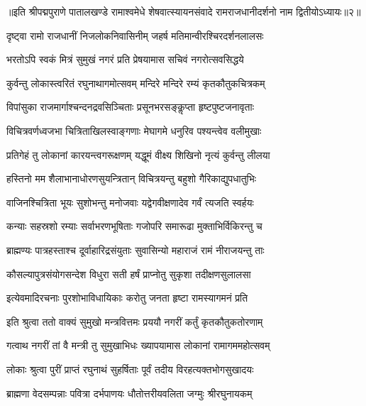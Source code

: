 ॥इति श्रीपद्मपुराणे पातालखण्डे रामाश्वमेधे शेषवात्स्यायनसंवादे रामराजधानीदर्शनो नाम द्वितीयोऽध्यायः॥२॥



\twolineshloka
{दृष्ट्वा रामो राजधानीं निजलोकनिवासिनीम्}
{जहर्ष मतिमान्वीरश्चिरदर्शनलालसः}%

\twolineshloka
{भरतोऽपि स्वकं मित्रं सुमुखं नगरं प्रति}
{प्रेषयामास सचिवं नगरोत्सवसिद्धये}%


\twolineshloka
{कुर्वन्तु लोकास्त्वरितं रघुनाथागमोत्सवम्}
{मन्दिरे मन्दिरे रम्यं कृतकौतुकचित्रकम्}%

\twolineshloka
{विपांसुका राजमार्गाश्चन्दनद्रवसिञ्चिताः}
{प्रसूनभरसङ्कॢप्ता हृष्टपुष्टजनावृताः}%

\twolineshloka
{विचित्रवर्णध्वजभा चित्रिताखिलस्वाङ्गणाः}
{मेघागमे धनुरिव पश्यन्त्वेव वलीमुखाः}%

\twolineshloka
{प्रतिगेहं तु लोकानां कारयन्त्वगरूक्षणम्}
{यद्धूमं वीक्ष्य शिखिनो नृत्यं कुर्वन्तु लीलया}%

\twolineshloka
{हस्तिनो मम शैलाभानाधोरणसुयन्त्रितान्}
{विचित्रयन्तु बहुशो गैरिकाद्युपधातुभिः}%

\twolineshloka
{वाजिनश्चित्रिता भूयः सुशोभन्तु मनोजवाः}
{यद्वेगवीक्षणादेव गर्वं त्यजति स्वर्हयः}%

\twolineshloka
{कन्याः सहस्रशो रम्याः सर्वाभरणभूषिताः}
{गजोपरि समारूढा मुक्ताभिर्विकिरन्तु च}%

\twolineshloka
{ब्राह्मण्यः पात्रहस्ताश्च दूर्वाहारिद्रसंयुताः}
{सुवासिन्यो महाराजं रामं नीराजयन्तु ताः}%

\twolineshloka
{कौसल्यापुत्रसंयोगसन्देश विधुरा सती}
{हर्षं प्राप्नोतु सुकृशा तदीक्षणसुलालसा}%

\twolineshloka
{इत्येवमादिरचनाः पुरशोभाविधायिकाः}
{करोतु जनता हृष्टा रामस्यागमनं प्रति}%


\twolineshloka
{इति श्रुत्वा ततो वाक्यं सुमुखो मन्त्रवित्तमः}
{प्रययौ नगरीं कर्तुं कृतकौतुकतोरणाम्}%

\twolineshloka
{गत्वाथ नगरीं तां वै मन्त्री तु सुमुखाभिधः}
{ख्यापयामास लोकानां रामागममहोत्सवम्}%

\twolineshloka
{लोकाः श्रुत्वा पुरीं प्राप्तं रघुनाथं सुहर्षिताः}
{पूर्वं तदीय विरहत्यक्तभोगसुखादयः}%

\twolineshloka
{ब्राह्मणा वेदसम्पन्नाः पवित्रा दर्भपाणयः}
{धौतोत्तरीयवलिता जग्मुः श्रीरघुनायकम्}%

